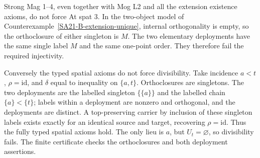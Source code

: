 \begin{counterexample}
\label{SA21-B-spatial-separations}
Strong Mag 1--4, even together with Mog L2 and all the extension
existence axioms, do not force At spat 3. In the two-object model of
Counterexample~\ref{SA21-B-extension-unique}, internal orthogonality
is empty, so the orthoclosure of either singleton is \(M\). The two
elementary deployments have the same single label \(M\) and the
same one-point order. They therefore fail the required injectivity.

Conversely the typed spatial axioms do not force divisibility.
Take incidence \(a<t\), \(\rho=\mathrm{id}\), and
\(\delta\) equal to inequality on \(\{a,t\}\). Orthoclosures are
singletons. The two deployments are the labelled singleton
\(\{\{a\}\}\) and the labelled chain
\(\{a\}<\{t\}\); labels within a deployment are nonzero and
orthogonal, and the deployments are distinct. A top-preserving
carrier by inclusion of these singleton labels exists exactly for
an identical source and target, recovering \(\rho=\mathrm{id}\).
Thus the fully typed spatial axioms hold. The only lieu is \(a\),
but \(U_t=\varnothing\), so divisibility fails. The finite
certificate checks the orthoclosures and both deployment assertions.
\end{counterexample}

